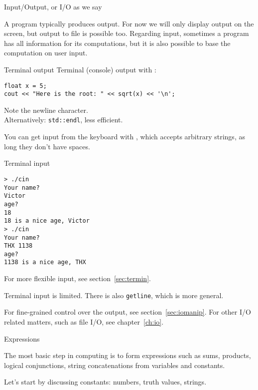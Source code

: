  {Input/Output, or I/O as we say}
\label{sec:io}

A program typically produces output. For now we will only display
output on the screen, but output to file is possible too.  Regarding
input, sometimes a program has all information for its computations,
but it is also possible to base the computation on user input.

\begin{block}{Terminal output}
  \label{sl:cout}
Terminal (console) output with :
\begin{lstlisting}
float x = 5;
cout << "Here is the root: " << sqrt(x) << '\n';
\end{lstlisting}
Note the newline character.\\
Alternatively: \lstinline{std::endl}, less efficient.
\end{block}

You can get input from the keyboard with ,
which accepts arbitrary strings, as long they don't have spaces.

\begin{block}{Terminal input}
  \label{sl:cin}
\begin{multicols}{2}
  \vfill
  \columnbreak
\begin{verbatim}
> ./cin
Your name?
Victor
age?
18
18 is a nice age, Victor
> ./cin
Your name?
THX 1138
age?
1138 is a nice age, THX
\end{verbatim}
\end{multicols}
\end{block}

For more flexible input, see section~\ref{sec:termin}.

\begin{slide}{Terminal input}
  \label{sl:cin-more}
   is limited.
  There is also \lstinline{getline}, which is more general.
\end{slide}

For fine-grained control over the output, see section~\ref{sec:iomanip}.
For other I/O related matters, such as file I/O, see chapter~\ref{ch:io}.

 {Expressions}
\label{sec:expr}

The most basic step in computing is to form expressions such as sums,
products, logical conjunctions, string concatenations
from variables and constants.

Let's start by discussing constants:
numbers, truth values, strings.


